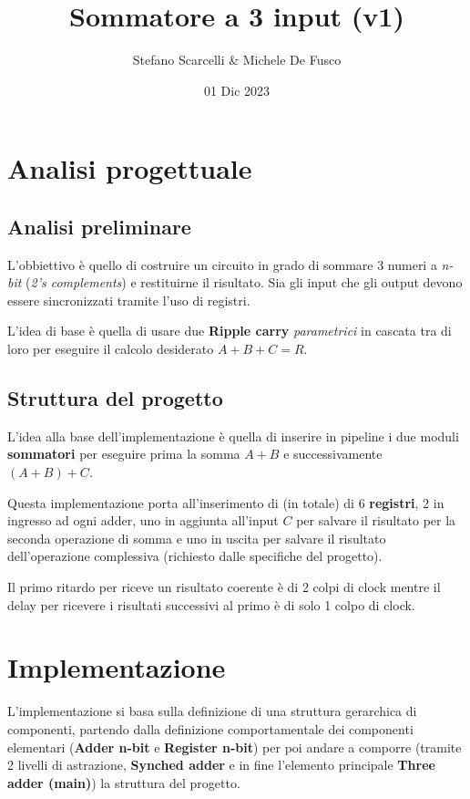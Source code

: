 \documentclass[12pt]{article}
\title{Sommatore a 3 input (v1)}
\author{Stefano Scarcelli \& Michele De Fusco}
\date{01 Dic 2023}
\begin{document}
\maketitle
\newpage

\tableofcontents
\newpage


\section{Analisi progettuale}
    \subsection{Analisi preliminare}
        L'obbiettivo è quello di costruire un circuito in grado di sommare 3 numeri a \textit{n-bit} (\textit{2's complements}) e restituirne il risultato. Sia gli input che gli output devono essere sincronizzati tramite l'uso di registri.

        L'idea di base è quella di usare due \textbf{Ripple carry} \textit{parametrici} in cascata tra di loro per eseguire il calcolo desiderato $A+B+C=R$.
    
    \subsection{Struttura del progetto}
        L'idea alla base dell'implementazione è quella di inserire in pipeline i due moduli \textbf{sommatori} per eseguire prima la somma $A+B$ e successivamente $(A+B)+C$.

        Questa implementazione porta all'inserimento di (in totale) di 6 \textbf{registri}, 2 in ingresso ad ogni adder, uno in aggiunta all'input $C$ per salvare il risultato per la seconda operazione di somma e uno in uscita per salvare il risultato dell'operazione complessiva (richiesto dalle specifiche del progetto).

        Il primo ritardo per riceve un risultato coerente è di 2 colpi di clock mentre il delay per ricevere i risultati successivi al primo è di solo 1 colpo di clock.

\section{Implementazione}
    L'implementazione si basa sulla definizione di una struttura gerarchica di componenti, partendo dalla definizione comportamentale dei componenti elementari (\textbf{Adder n-bit} e \textbf{Register n-bit}) per poi andare a comporre (tramite 2 livelli di astrazione, \textbf{Synched adder} e in fine l'elemento principale \textbf{Three adder (main)}) la struttura del progetto.
\end{document}
